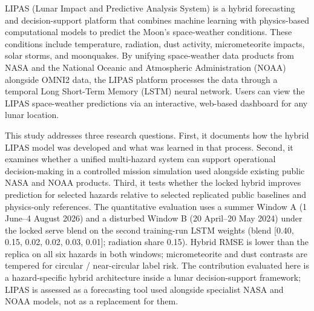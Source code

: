 LIPAS (Lunar Impact and Predictive Analysis System) is a hybrid forecasting and decision-support platform that combines machine learning with physics-based computational models to predict the Moon's space-weather conditions. These conditions include temperature, radiation, dust activity, micrometeorite impacts, solar storms, and moonquakes. By unifying space-weather data products from NASA and the National Oceanic and Atmospheric Administration (NOAA) alongside OMNI2 data, the LIPAS platform processes the data through a temporal Long Short-Term Memory (LSTM) neural network. Users can view the LIPAS space-weather predictions via an interactive, web-based dashboard for any lunar location.

This study addresses three research questions. First, it documents how the hybrid LIPAS model was developed and what was learned in that process. Second, it examines whether a unified multi-hazard system can support operational decision-making in a controlled mission simulation used alongside existing public NASA and NOAA products. Third, it tests whether the locked hybrid improves prediction for selected hazards relative to selected replicated public baselines and physics-only references. The quantitative evaluation uses a summer Window A (1 June--4 August 2026) and a disturbed Window B (20 April--20 May 2024) under the locked serve blend on the second training-run LSTM weights (blend [0.40, 0.15, 0.02, 0.02, 0.03, 0.01]; radiation share 0.15). Hybrid RMSE is lower than the replica on all six hazards in both windows; micrometeorite and dust contrasts are tempered for circular / near-circular label risk. The contribution evaluated here is a hazard-specific hybrid architecture inside a lunar decision-support framework; LIPAS is assessed as a forecasting tool used alongside specialist NASA and NOAA models, not as a replacement for them.

